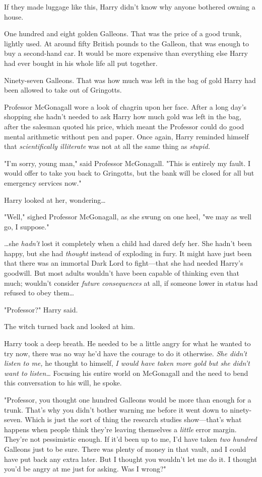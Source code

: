 If they made luggage like this, Harry didn't know why anyone bothered owning a
house.

One hundred and eight golden Galleons. That was the price of a good trunk,
lightly used. At around fifty British pounds to the Galleon, that was enough to
buy a second-hand car. It would be more expensive than everything else Harry
had ever bought in his whole life all put together.

Ninety-seven Galleons. That was how much was left in the bag of gold Harry had
been allowed to take out of Gringotts.

Professor McGonagall wore a look of chagrin upon her face. After a long day's
shopping she hadn't needed to ask Harry how much gold was left in the bag,
after the salesman quoted his price, which meant the Professor could do good
mental arithmetic without pen and paper. Once again, Harry reminded himself
that \emph{scientifically illiterate} was not at all the same thing as
\emph{stupid.}

"I'm sorry, young man," said Professor McGonagall. "This is entirely my fault.
I would offer to take you back to Gringotts, but the bank will be closed for
all but emergency services now."

Harry looked at her, wondering{\ldots}

"Well," sighed Professor McGonagall, as she swung on one heel, "we may as well
go, I suppose."

{\ldots}she \emph{hadn't} lost it completely when a child had dared defy her.
She hadn't been happy, but she had \emph{thought} instead of exploding in fury.
It might have just been that there was an immortal Dark Lord to fight---that
she had needed Harry's goodwill. But most adults wouldn't have been capable of
thinking even that much; wouldn't consider \emph{future consequences} at all,
if someone lower in status had refused to obey them{\ldots}

"Professor?" Harry said.

The witch turned back and looked at him.

Harry took a deep breath. He needed to be a little angry for what he wanted to
try now, there was no way he'd have the courage to do it otherwise. \emph{She
didn't listen to me,} he thought to himself, \emph{I would have taken more gold
but she didn't want to listen{\ldots}} Focusing his entire world on McGonagall
and the need to bend this conversation to his will, he spoke.

"Professor, you thought one hundred Galleons would be more than enough for a
trunk. That's why you didn't bother warning me before it went down to
ninety-seven. Which is just the sort of thing the research studies
show---that's what happens when people think they're leaving themselves a
\emph{little} error margin. They're not pessimistic enough. If it'd been up to
me, I'd have taken \emph{two hundred} Galleons just to be sure. There was
plenty of money in that vault, and I could have put back any extra later. But I
thought you wouldn't let me do it. I thought you'd be angry at me just for
asking. Was I wrong?"

